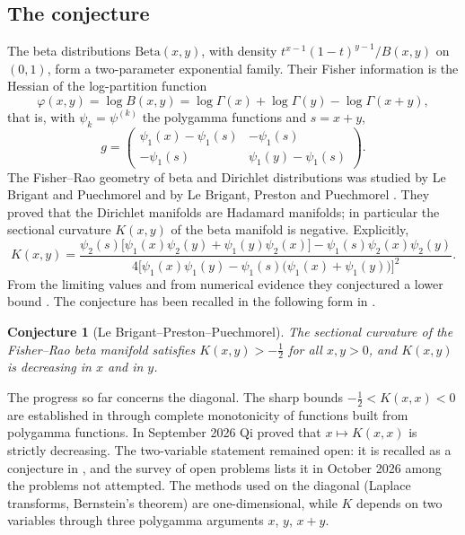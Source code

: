 \documentclass[11pt,a4paper]{article}
\newtheorem{conjecture}[theorem]{Conjecture}
\theoremstyle{definition}
\theoremstyle{remark}
\begin{document}
\subsection{The conjecture}
The beta distributions $\mathrm{Beta}(x,y)$, with density $t^{x-1}(1-t)^{y-1}/B(x,y)$ on $(0,1)$, form a two-parameter exponential family. Their Fisher information is the Hessian of the log-partition function
\[
\varphi(x,y)=\log B(x,y)=\log\Gamma(x)+\log\Gamma(y)-\log\Gamma(x+y),
\]
that is, with $\psi_k=\psi^{(k)}$ the polygamma functions and $s=x+y$,
\begin{equation}\label{eq:metric}
g=\begin{pmatrix}\psi_1(x)-\psi_1(s)&-\psi_1(s)\\-\psi_1(s)&\psi_1(y)-\psi_1(s)\end{pmatrix}.
\end{equation}
The Fisher--Rao geometry of beta and Dirichlet distributions was studied by Le Brigant and Puechmorel \cite{LBP19} and by Le Brigant, Preston and Puechmorel \cite{LBPP21}. They proved that the Dirichlet manifolds are Hadamard manifolds; in particular the sectional curvature $K(x,y)$ of the beta manifold is negative. Explicitly,
\begin{equation}\label{eq:K}
K(x,y)=\frac{\psi_2(s)\bigl[\psi_1(x)\psi_2(y)+\psi_1(y)\psi_2(x)\bigr]-\psi_1(s)\psi_2(x)\psi_2(y)}{4\bigl[\psi_1(x)\psi_1(y)-\psi_1(s)\bigl(\psi_1(x)+\psi_1(y)\bigr)\bigr]^2}.
\end{equation}
From the limiting values and from numerical evidence they conjectured a lower bound \cite{LBPP21}. The conjecture has been recalled in the following form in \cite{QA24,Qi26}.

\begin{conjecture}[Le Brigant--Preston--Puechmorel]\label{conj:LBPP}
The sectional curvature of the Fisher--Rao beta manifold satisfies $K(x,y)>-\frac12$ for all $x,y>0$, and $K(x,y)$ is decreasing in $x$ and in $y$.
\end{conjecture}

The progress so far concerns the diagonal. The sharp bounds $-\tfrac12<K(x,x)<0$ are established in \cite{Qi21,QA24} through complete monotonicity of functions built from polygamma functions. In September 2026 Qi \cite{Qi26} proved that $x\mapsto K(x,x)$ is strictly decreasing. The two-variable statement remained open: it is recalled as a conjecture in \cite{Qi26}, and the survey of open problems \cite[§R2]{VMRC} lists it in October 2026 among the problems not attempted. The methods used on the diagonal (Laplace transforms, Bernstein's theorem) are one-dimensional, while $K$ depends on two variables through three polygamma arguments $x$, $y$, $x+y$.
\end{document}
